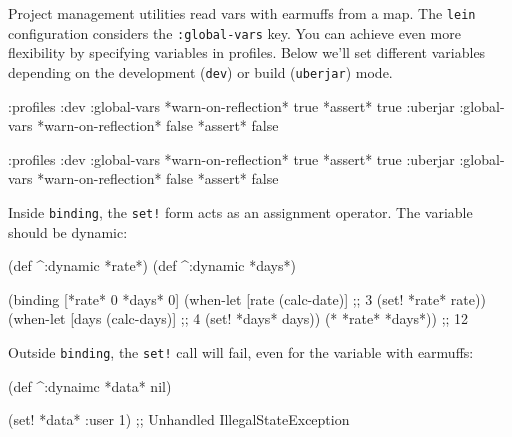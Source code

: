 
Project management utilities read vars with earmuffs from a map.
The \verb|lein| configuration considers the \verb|:global-vars| key.
You can achieve even more flexibility by specifying variables in profiles.
Below we'll set different variables depending on the development (\verb|dev|) or build (\verb|uberjar|) mode.

\ifx\DEVICETYPE\MOBILE

\begin{english}
  \begin{clojure}
{:profiles
 :dev {:global-vars
       {*warn-on-reflection* true
        *assert* true}}
 :uberjar {:global-vars
           {*warn-on-reflection* false
            *assert* false}}}
  \end{clojure}
\end{english}

\else

\begin{english}
  \begin{clojure}
{:profiles
 :dev {:global-vars {*warn-on-reflection* true
                     *assert* true}}
 :uberjar {:global-vars {*warn-on-reflection* false
                         *assert* false}}}
  \end{clojure}
\end{english}

\fi

Inside \verb|binding|, the \verb|set!| form acts as an assignment operator.
The variable should be dynamic:

\begin{english}
  \begin{clojure}
(def ^:dynamic *rate*)
(def ^:dynamic *days*)

(binding [*rate* 0
          *days* 0]
  (when-let [rate (calc-date)] ;; 3
    (set! *rate* rate))
  (when-let [days (calc-days)] ;; 4
    (set! *days* days))
  (* *rate* *days*))
;; 12
  \end{clojure}
\end{english}

\noindent
Outside \verb|binding|, the \verb|set!| call will fail, even for the variable with earmuffs:

\ifx\DEVICETYPE\MOBILE

\begin{english}
  \begin{clojure}
(def ^:dynaimc *data* nil)

(set! *data* {:user 1})
;; Unhandled IllegalStateException
  \end{clojure}
\end{english}

